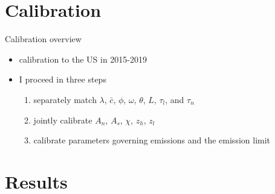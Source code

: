 \documentclass[11pt,aspectratio=169]{beamer}
\begin{document}
\section{Calibration}
	\begin{frame}{Calibration overview}
	\begin{itemize}
		\item<+-> calibration to the US in 2015-2019
		\item<+-> I proceed in three steps
		\vspace{4mm}
		\begin{enumerate}[<+-| alert@+>] %
			\item separately match $\lambda$, $\bar{c}$, $\phi$, $\omega$, $\theta$, $L$, $\tau_l$, and $\tau_n$
			\vspace{2mm}
			\item jointly calibrate $A_n$, $A_s$, $\chi$, $z_h$, $z_l$%
			\vspace{2mm}
			\item calibrate parameters governing emissions and the emission limit
		\end{enumerate}
	\end{itemize}
\end{frame}
\hypertarget{resback}{}
\section{Results}
\end{document}
